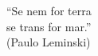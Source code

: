 \begin{epigrafe}
    \vspace*{\fill}
{%
	\noindent\hspace{.5\textwidth}
	{\begin{minipage}{.5\textwidth}
		\begin{flushright}
			``Se nem for terra\\ se trans for mar.''\\ (Paulo Leminski)
		\end{flushright}
	\end{minipage}}%
	\vspace*{3cm}
}%
\end{epigrafe}
